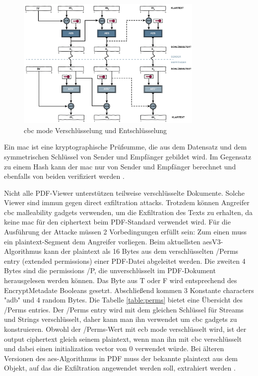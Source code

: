 \begin{figure}[!htbp]
	\centering
	\includegraphics[width=0.8\textwidth]{"images/cbc.png"}
	\caption{\gls{cbc} mode Verschlüsselung und Entschlüsselung \cite{cbc}}
	\label{fig:cbc}
\end{figure}

Ein \gls{mac} ist eine kryptographische Prüfsumme, die aus dem Datensatz und dem symmetrischen Schlüssel von Sender und Empfänger gebildet wird. Im Gegensatz zu einem Hash kann der \gls{mac} nur von Sender und Empfänger berechnet und ebenfalls von beiden verifiziert werden \cite{crypto-web}.
\par
Nicht alle PDF-Viewer unterstützen teilweise verschlüsselte Dokumente. Solche Viewer sind immun gegen direct exfiltration attacks. Trotzdem können Angreifer \gls{cbc} malleability gadgets verwenden, um die Exfiltration des Texts zu erhalten, da keine \gls{mac} für den ciphertext beim PDF-Standard verwendet wird. Für die Ausführung der Attacke müssen 2 Vorbedingungen erfüllt sein: Zum einen muss ein plaintext-Segment dem Angreifer vorliegen. Beim aktuellsten \gls{aes}V3-Algorithmus kann der plaintext als 16 Bytes aus dem verschlüsselten /Perms entry (extended permissions) einer PDF-Datei abgeleitet werden. Die zweiten 4 Bytes sind die permissions /P, die unverschlüsselt im PDF-Dokument herausgelesen werden können. Das Byte aus T oder F wird entsprechend des EncryptMetadate Booleans gesetzt. Abschließend kommen 3 Konstante characters "adb" und 4 random Bytes. Die Tabelle \ref{table:perms} bietet eine Übersicht des /Perms entries. Der /Perms entry wird mit dem gleichen Schlüssel für Streams und Strings verschlüsselt, daher kann man ihn verwendet um \gls{cbc} gadgets zu konstruieren. Obwohl der /Perms-Wert mit \gls{ecb} mode verschlüsselt wird, ist der output ciphertext gleich seinem plaintext, wenn man ihn mit \gls{cbc} verschlüsselt und dabei einen initialization vector von 0 verwendet würde. Bei älteren Versionen des \gls{aes}-Algorithmus in PDF muss der bekannte plaintext aus dem Objekt, auf das die Exfiltration angewendet werden soll, extrahiert werden \cite{ccc-break-pdf, pdfex}.

